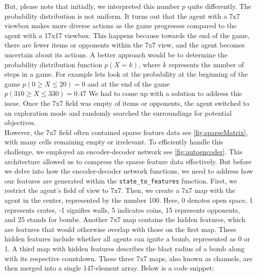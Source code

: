But, please note that initially, we interpreted this number $p$ quite differently. The probability distribution is not uniform. 
It turns out that the agent with a 7x7 viewbox makes more diverse actions as the game progresses compared to the agent with a 17x17 viewbox. 
This happens because towards the end of the game, there are fewer items or opponents within the 7x7 view, and the agent becomes uncertain about its actions. 
A better approach would be to determine the probability distribution function $p(X = k)$, where $k$ represents the number of steps in a game.
For example lets look at the probability at the beginning of the game $p(0 \geq X \leq 20) = 0$ and at the end of the game $p(310 \geq X \leq 330) = 0.47$
We had to come up with a solution to address this issue. Once the 7x7 field was empty of items or opponents, the agent switched to an exploration mode and randomly 
searched the surroundings for potential objectives.\\

However, the 7x7 field often contained sparse feature data see \autoref{fig:sparseMatrix}, with many cells remaining empty or irrelevant. 
To efficiently handle this challenge, we employed an encoder-decoder network see \autoref{fig:autoencoder}. This architecture allowed us 
to compress the sparse feature data effectively. But before we delve into how the encoder-decoder network functions, we need to address how our 
features are generated within the \verb|state_to_features| function. First, we restrict the agent's field of view to 7x7. Then, we create a 7x7 map 
with the agent in the center, represented by the number 100. Here, 0 denotes open space, 1 represents crates, -1 signifies walls, 5 indicates coins, 15 represents 
opponents, and 25 stands for bombs. Another 7x7 map contains the hidden features, which are features that would otherwise overlap with those on the first map. 
These hidden features include whether all agents can ignite a bomb, represented as 0 or 1. A third map with hidden features describes the blast radius of a 
bomb along with its respective countdown. These three 7x7 maps, also known as channels, are then merged into a 
single 147-element array. Below is a code snippet:

